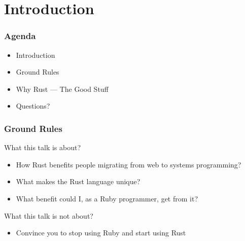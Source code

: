 \section{Introduction}
\label{sec:introduction}

\begin{frame}
  \frametitle{Agenda}
  \begin{itemize}
  \item Introduction
  \item Ground Rules
  \item Why Rust --- The Good Stuff
  \item Questions?
  \end{itemize}
\end{frame}

\begin{frame}
  \frametitle{Ground Rules}
  What this talk is about?
  \begin{itemize}
  \item How Rust benefits people migrating from web to systems programming?
  \item What makes the Rust language unique?
  \item What benefit could I, as a Ruby programmer, get from it?
  \end{itemize}
  What this talk is not about?
  \begin{itemize}
  \item Convince you to stop using Ruby and start using Rust
  \end{itemize}
\end{frame}
